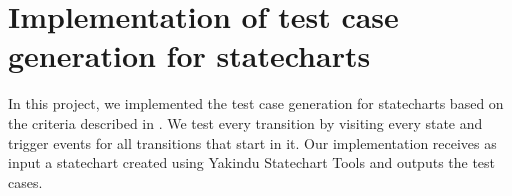 \chapter{Implementation of test case generation for statecharts}
\label{cap:testgen}


%

%

In this project, we implemented the test case generation for statecharts based on the criteria described in \cite{bogdanov}. We test every transition by visiting every state and trigger events for all transitions that start in it. Our implementation receives as input a statechart created using Yakindu Statechart Tools \cite{Yakindu} and outputs the test cases.




